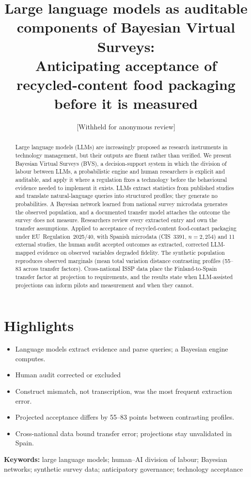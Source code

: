 \documentclass[11pt,a4paper]{article}
\title{Large language models as auditable components of Bayesian Virtual
Surveys:\\
Anticipating acceptance of recycled-content food packaging before it is measured}
\author{[Withheld for anonymous review]}
\begin{document}
\maketitle

\section*{Highlights}
\begin{itemize}
\item Language models extract evidence and parse queries; a Bayesian engine computes.
\item Human audit corrected or excluded %
\item Construct mismatch, not transcription, was the most frequent extraction error.
\item Projected acceptance differs by 55--83 points between contrasting profiles.
\item Cross-national data bound transfer error; projections stay unvalidated in Spain.
\end{itemize}

\begin{abstract}
Large language models (LLMs) are increasingly proposed as research instruments
in technology management, but their outputs are fluent rather than verified.
We present Bayesian Virtual Surveys (BVS), a decision-support system in which
the division of labour between LLMs, a probabilistic engine and human
researchers is explicit and auditable, and apply it where a regulation fixes a
technology before the behavioural evidence needed to implement it exists. LLMs
extract statistics from published studies and translate natural-language
queries into structured profiles; they generate no probabilities. A Bayesian
network learned from national survey microdata generates the observed
population, and a documented transfer model attaches the outcome the survey
does not measure. Researchers review every extracted entry and own the transfer
assumptions. Applied to acceptance of recycled-content food-contact packaging
under EU~Regulation~2025/40, with Spanish microdata (CIS~3391,
$n = 2{,}254$) and 11 external studies, the human audit accepted
outcomes as extracted, corrected %
LLM-mapped evidence on observed variables degraded fidelity. The synthetic
population reproduces observed marginals (mean total variation distance
contrasting profiles (55--83 across transfer factors). Cross-national ISSP data
place the Finland-to-Spain transfer factor at %
projection to %
requirements, and the results state when LLM-assisted projections can inform
pilots and measurement and when they cannot.
\end{abstract}

\noindent\textbf{Keywords:} large language models; human--AI division of labour;
Bayesian networks; synthetic survey data; anticipatory governance; technology
acceptance
\end{document}
